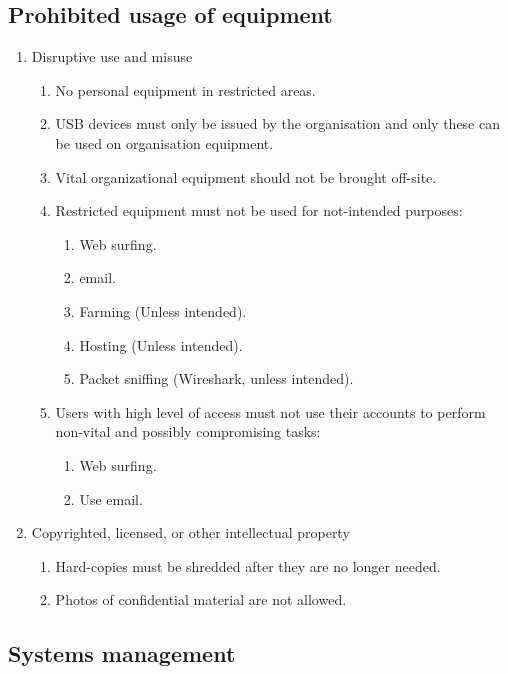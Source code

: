 \subsection{Prohibited usage of equipment}

\begin{enumerate}
  \item Disruptive use and misuse
  \begin{enumerate}
    \item No personal equipment in restricted areas.
    \item USB devices must only be issued by the organisation and only these can be used on organisation equipment.
    \item Vital organizational equipment should not be brought off-site.
    \item Restricted equipment must not be used for not-intended purposes:
    \begin{enumerate}
      \item Web surfing.
      \item email.
      \item Farming (Unless intended).
      \item Hosting (Unless intended).
      \item Packet sniffing (Wireshark, unless intended).
    \end{enumerate}
    \item Users with high level of access must not use their accounts to perform non-vital and possibly compromising tasks:
    \begin{enumerate}
        \item Web surfing.
        \item Use email.
    \end{enumerate}
  \end{enumerate}
  \item Copyrighted, licensed, or other intellectual property \begin{enumerate}
        \item Hard-copies must be shredded after they are no longer needed. 
        \item Photos of confidential material are not allowed.
    \end{enumerate}
\end{enumerate}

\subsection{Systems management}

